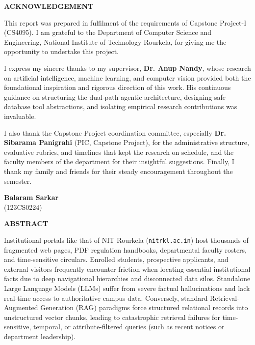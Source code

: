 \documentclass[12pt,a4paper]{report}
\begin{document}
\newpage
\begin{center}
    {\Large \textbf{ACKNOWLEDGEMENT}}
\end{center}
\vspace{1.5cm}

This report was prepared in fulfilment of the requirements of Capstone Project-I (CS4095). I am grateful to the Department of Computer Science and Engineering, National Institute of Technology Rourkela, for giving me the opportunity to undertake this project.

I express my sincere thanks to my supervisor, \textbf{Dr. Anup Nandy}, whose research on artificial intelligence, machine learning, and computer vision provided both the foundational inspiration and rigorous direction of this work. His continuous guidance on structuring the dual-path agentic architecture, designing safe database tool abstractions, and isolating empirical research contributions was invaluable.

I also thank the Capstone Project coordination committee, especially \textbf{Dr. Sibarama Panigrahi} (PIC, Capstone Project), for the administrative structure, evaluative rubrics, and timelines that kept the research on schedule, and the faculty members of the department for their insightful suggestions. Finally, I thank my family and friends for their steady encouragement throughout the semester.

\vspace{3.5cm}
\begin{flushright}
    \textbf{Balaram Sarkar}\\
    (123CS0224)
\end{flushright}

\newpage
\begin{center}
    {\Large \textbf{ABSTRACT}}
\end{center}
\vspace{1.0cm}

Institutional portals like that of NIT Rourkela (\texttt{nitrkl.ac.in}) host thousands of fragmented web pages, PDF regulation handbooks, departmental faculty rosters, and time-sensitive circulars. Enrolled students, prospective applicants, and external visitors frequently encounter friction when locating essential institutional facts due to deep navigational hierarchies and disconnected data silos. Standalone Large Language Models (LLMs) suffer from severe factual hallucinations and lack real-time access to authoritative campus data. Conversely, standard Retrieval-Augmented Generation (RAG) paradigms force structured relational records into unstructured vector chunks, leading to catastrophic retrieval failures for time-sensitive, temporal, or attribute-filtered queries (such as recent notices or department leadership).
\end{document}
